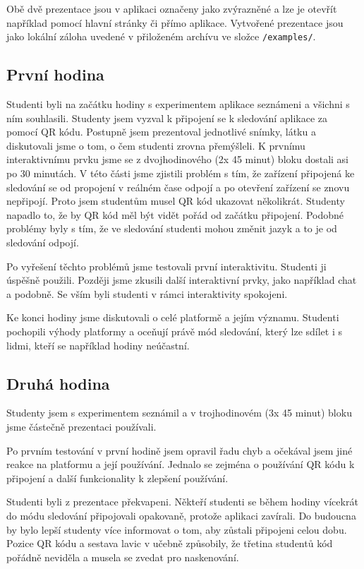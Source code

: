 Obě dvě prezentace jsou v aplikaci označeny jako zvýrazněné a lze je otevřít například pomocí hlavní stránky či přímo aplikace.
Vytvořené prezentace jsou jako lokální záloha uvedené v přiloženém archívu ve složce \verb|/examples/|.

\subsection{První hodina}

Studenti byli na začátku hodiny s experimentem aplikace seznámeni a všichni s ním souhlasili.
Studenty jsem vyzval k připojení se k sledování aplikace za pomocí QR kódu.
Postupně jsem prezentoval jednotlivé snímky, látku a diskutovali jsme o tom, o čem studenti zrovna přemýšleli.
K prvnímu interaktivnímu prvku jsme se z dvojhodinového (2x 45 minut) bloku dostali asi po 30 minutách.
V této části jsme zjistili problém s tím, že zařízení připojená ke sledování se od propojení v reálném čase odpojí a po otevření zařízení se znovu nepřipojí.
Proto jsem studentům musel QR kód ukazovat několikrát.
Studenty napadlo to, že by QR kód měl být vidět pořád od začátku připojení.
Podobné problémy byly s tím, že ve sledování studenti mohou změnit jazyk a to je od sledování odpojí.

Po vyřešení těchto problémů jsme testovali první interaktivitu.
Studenti ji úspěšně použili.
Později jsme zkusili další interaktivní prvky, jako například chat a podobně.
Se vším byli studenti v rámci interaktivity spokojeni.

Ke konci hodiny jsme diskutovali o celé platformě a jejím významu.
Studenti pochopili výhody platformy a oceňují právě mód sledování, který lze sdílet i s lidmi, kteří se například hodiny neúčastní.

\subsection{Druhá hodina}

Studenty jsem s experimentem seznámil a v trojhodinovém (3x 45 minut) bloku jsme částečně prezentaci používali.

Po prvním testování v první hodině jsem opravil řadu chyb a očekával jsem jiné reakce na platformu a její používání.
Jednalo se zejména o používání QR kódu k připojení a další funkcionality k zlepšení používání. 

Studenti byli z prezentace překvapeni. 
Někteří studenti se během hodiny vícekrát do módu sledování připojovali opakovaně, protože aplikaci zavírali.
Do budoucna by bylo lepší studenty více informovat o tom, aby zůstali připojeni celou dobu.
Pozice QR kódu a sestava lavic v učebně způsobily, že třetina studentů kód pořádně neviděla a musela se zvedat pro naskenování.

